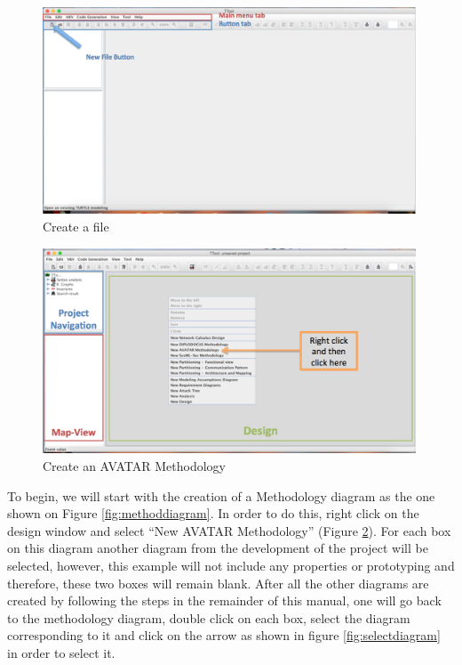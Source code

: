 \documentclass[12pt]{article}
\begin{document}
\begin{figure}[htbp]
\centering
\includegraphics[width=0.99\textwidth]{fig/createfile.png}
\caption{Create a file} \label{fig:createfile}
\end{figure}

\begin{figure}[htbp]
\centering
\includegraphics[width=0.99\textwidth]{fig/createmethod.png}
\caption{Create an AVATAR Methodology} \label{fig:createmethod}
\end{figure}

To begin, we will start with the creation of a Methodology diagram as the one shown on Figure \ref{fig:methoddiagram}. In order to do this, right click on the design window and select “New AVATAR Methodology” (Figure \ref{fig:createmethod}). For each box on this diagram another diagram from the development of the project will be selected, however, this example will not include any properties or prototyping and therefore, these two boxes will remain blank. After all the other diagrams are created by following the steps in the remainder of this manual, one will go back to the methodology diagram, double click on each box, select the diagram corresponding to it and click on the arrow as shown in figure \ref{fig:selectdiagram} in order to select it. 
\end{document}
